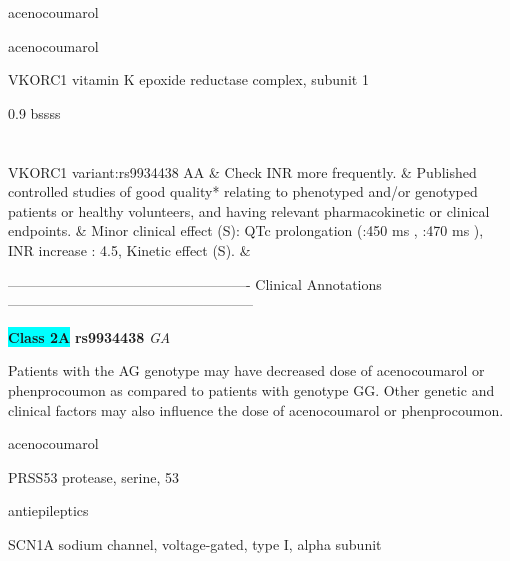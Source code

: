 \documentclass{resume} %
\begin{document}
\begin{rSection}{ acenocoumarol }
\begin{rSection}{ acenocoumarol }
\begin{rSubsection}{ VKORC1 }{ vitamin K epoxide reductase complex, subunit 1 }{}{}
\begin{center}
\begin{tabularx}{0.9\textwidth}{ bssss }
		\vspace{1pt}\\
		\hline \\
		\vspace{1pt}\\
		         VKORC1 variant:rs9934438 AA & Check INR more frequently. & Published controlled studies of good quality* relating to phenotyped and/or genotyped patients or healthy volunteers, and having relevant pharmacokinetic or clinical endpoints. & Minor clinical effect (S): QTc prolongation (:450 ms , :470 ms ),  INR increase : 4.5,  Kinetic effect (S). &
\\
		\end{tabularx}
		\end{center}
		\normalsize
		\vspace{10pt}
		        
\item[] ---------------------------------------------------- Clinical Annotations -----------------------------------------------------\newline
\item \textbf{\colorbox{cyan} {Class 2A}} \textbf{ rs9934438 } \textit{ GA }
\item[] Patients with the AG genotype may have decreased dose of acenocoumarol or phenprocoumon as compared to patients with genotype GG. Other genetic and clinical factors may also influence the dose of acenocoumarol or phenprocoumon.

\end{rSubsection}
\begin{rSection}{ acenocoumarol }
\item[]
\begin{rSubsection}{ PRSS53 }{ protease, serine, 53 }{}{}
\item[]


\end{rSubsection}

\end{rSection}
\begin{rSection}{ antiepileptics }
\item[]
\begin{rSubsection}{ SCN1A }{ sodium channel, voltage-gated, type I, alpha subunit }{}{}
\item[]


\end{rSubsection}


\end{rSection}
\end{rSection}
\end{rSection}
\end{document}
